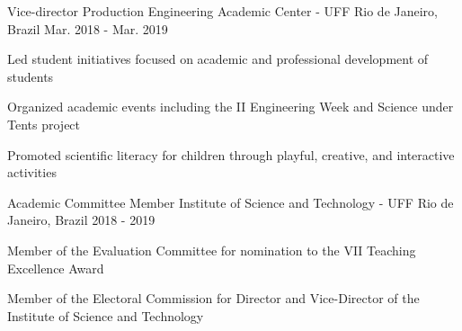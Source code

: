 

\begin{cventries}

  \cventry
    {Vice-director} %
    {Production Engineering Academic Center - UFF} %
    {Rio de Janeiro, Brazil} %
    {Mar. 2018 - Mar. 2019} %
    {
      \begin{cvitems} %
        \item {Led student initiatives focused on academic and professional development of students}
        \item {Organized academic events including the II Engineering Week and Science under Tents project}
        \item {Promoted scientific literacy for children through playful, creative, and interactive activities}
      \end{cvitems}
    }

  \cventry
    {Academic Committee Member} %
    {Institute of Science and Technology - UFF} %
    {Rio de Janeiro, Brazil} %
    {2018 - 2019} %
    {
      \begin{cvitems} %
        \item {Member of the Evaluation Committee for nomination to the VII Teaching Excellence Award}
        \item {Member of the Electoral Commission for Director and Vice-Director of the Institute of Science and Technology}
      \end{cvitems}
    }

\end{cventries} 